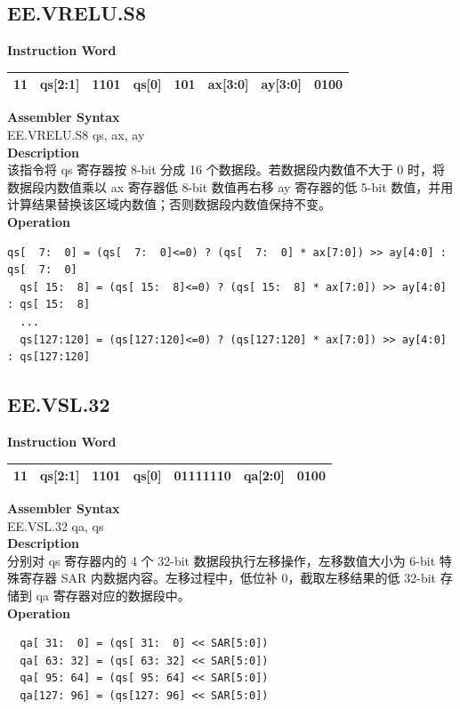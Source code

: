 \clearpage
\subsection{EE.VRELU.S8}\label{instruction:EEVRELUS8}
\setlength\tabcolsep{6pt}
\textbf{Instruction Word} \\
\begin{tabular}{|c|c|c|c|c|c|c|c|}
	\hline
	11 & qs[2:1] & 1101 & qs[0] & 101 & ax[3:0] & ay[3:0] & 0100 \\
	\hline
\end{tabular}

\textbf{Assembler Syntax} \\
EE.VRELU.S8 qs, ax, ay \\
\textbf{Description} \\
该指令将 qs 寄存器按 8-bit 分成 16 个数据段。若数据段内数值不大于 0 时，将数据段内数值乘以 ax 寄存器低 8-bit 数值再右移 ay 寄存器的低 5-bit 数值，并用计算结果替换该区域内数值；否则数据段内数值保持不变。\\
\textbf{Operation}
\begin{lstlisting}[escapeinside=`?]
  qs[  7:  0] = (qs[  7:  0]<=0) ? (qs[  7:  0] * ax[7:0]) >> ay[4:0] : qs[  7:  0]
  qs[ 15:  8] = (qs[ 15:  8]<=0) ? (qs[ 15:  8] * ax[7:0]) >> ay[4:0] : qs[ 15:  8]
  ...
  qs[127:120] = (qs[127:120]<=0) ? (qs[127:120] * ax[7:0]) >> ay[4:0] : qs[127:120]
\end{lstlisting}

\clearpage
\subsection{EE.VSL.32}\label{instruction:EEVSL32}
\setlength\tabcolsep{6pt}
\textbf{Instruction Word} \\
\begin{tabular}{|c|c|c|c|c|c|c|}
	\hline
	11 & qs[2:1] & 1101 & qs[0] & 01111110 & qa[2:0] & 0100 \\
	\hline
\end{tabular}

\textbf{Assembler Syntax} \\
EE.VSL.32 qa, qs \\
\textbf{Description} \\
分别对 qs 寄存器内的 4 个 32-bit 数据段执行左移操作，左移数值大小为 6-bit 特殊寄存器 SAR 内数据内容。左移过程中，低位补 0，截取左移结果的低 32-bit 存储到 qa 寄存器对应的数据段中。\\
\textbf{Operation}
\begin{lstlisting}
  qa[ 31:  0] = (qs[ 31:  0] << SAR[5:0])
  qa[ 63: 32] = (qs[ 63: 32] << SAR[5:0])
  qa[ 95: 64] = (qs[ 95: 64] << SAR[5:0])
  qa[127: 96] = (qs[127: 96] << SAR[5:0])
\end{lstlisting}




